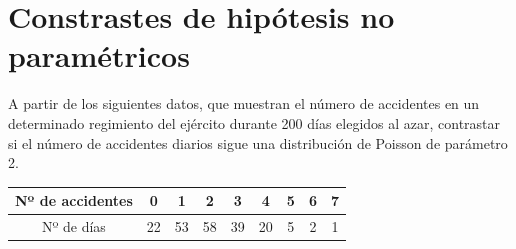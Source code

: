 \section{Constrastes de hipótesis no paramétricos}

\begin{ejercicio}
    A partir de los siguientes datos, que muestran el número de accidentes en un determinado regimiento del ejército durante 200 días elegidos al azar, contrastar si el número de accidentes diarios sigue una distribución de Poisson de parámetro 2.    
    \begin{table}[H]
    \centering
    \begin{tabular}{c|cccccccc}
        \hline
        Nº de accidentes & 0 & 1 & 2 & 3 & 4 & 5 & 6 & 7 \\
        \hline
        Nº de días & 22 & 53 & 58 & 39 & 20 & 5 & 2 & 1 \\
        \hline
    \end{tabular}
    \end{table}~\\


\end{ejercicio}
